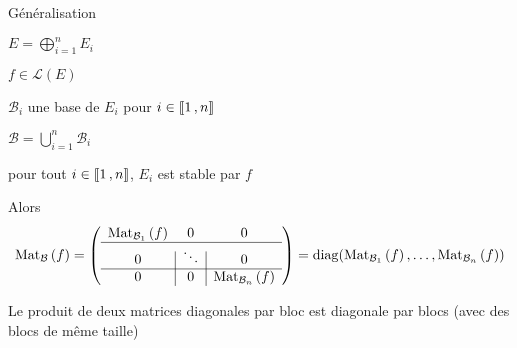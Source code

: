     \begin{prop}{Généralisation}{}
        \begin{soit}
            \item $E = \bigoplus_{i=1}^n E_i$
            \item $f \in \mathcal{L}(E)$
            \item $\mathcal{B}_i$ une base de $E_i$ pour $i \in \left\llbracket 1 \, , n \right\rrbracket$
            \item $\mathcal{B} = \bigcup_{i=1}^n \mathcal{B}_i$
        \end{soit}
        \begin{suppose}
            \item pour tout $i \in \left\llbracket 1 \, , n \right\rrbracket$, $E_i$ est stable par $f$
        \end{suppose}
        Alors 
        \[ \text{Mat}_{\mathcal{B}}\left(f\right) = \left( \begin{array}{c | c | c}
            \text{Mat}_{\mathcal{B}_1}\left(f\right) & 0 & 0 \\
            \hline 
            0 & \ddots & 0 \\
            \hline
            0 & 0 & \text{Mat}_{\mathcal{B}_n}\left(f\right)
        \end{array} \right) = \operatorname{diag}(\text{Mat}_{\mathcal{B}_1}\left(f\right), \ldots, \text{Mat}_{\mathcal{B}_n}\left(f\right)) \]
    \end{prop}

    \begin{prop}{}{}
        Le produit de deux matrices diagonales par bloc est diagonale par blocs (avec des blocs de même taille)
    \end{prop}

